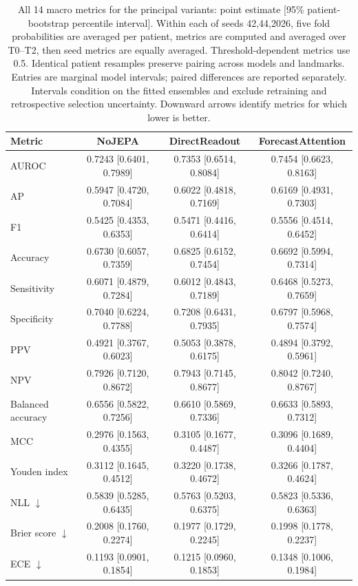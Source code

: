 \begin{table}[t]
\centering
\footnotesize
\setlength{\tabcolsep}{5pt}
\caption{All 14 macro metrics for the principal variants: point estimate [95\% patient-bootstrap percentile interval]. Within each of seeds 42,44,2026, five fold probabilities are averaged per patient, metrics are computed and averaged over T0--T2, then seed metrics are equally averaged. Threshold-dependent metrics use 0.5. Identical patient resamples preserve pairing across models and landmarks. Entries are marginal model intervals; paired differences are reported separately. Intervals condition on the fitted ensembles and exclude retraining and retrospective selection uncertainty. Downward arrows identify metrics for which lower is better.}
\label{tab:extended_macro}
\begin{tabular}{lccc}
\toprule
Metric & NoJEPA & DirectReadout & ForecastAttention \\
\midrule
AUROC & 0.7243 [0.6401, 0.7989] & 0.7353 [0.6514, 0.8084] & 0.7454 [0.6623, 0.8163] \\
AP & 0.5947 [0.4720, 0.7084] & 0.6022 [0.4818, 0.7169] & 0.6169 [0.4931, 0.7303] \\
F1 & 0.5425 [0.4353, 0.6353] & 0.5471 [0.4416, 0.6414] & 0.5556 [0.4514, 0.6452] \\
Accuracy & 0.6730 [0.6057, 0.7359] & 0.6825 [0.6152, 0.7454] & 0.6692 [0.5994, 0.7314] \\
Sensitivity & 0.6071 [0.4879, 0.7284] & 0.6012 [0.4843, 0.7189] & 0.6468 [0.5273, 0.7659] \\
Specificity & 0.7040 [0.6224, 0.7788] & 0.7208 [0.6431, 0.7935] & 0.6797 [0.5968, 0.7574] \\
PPV & 0.4921 [0.3767, 0.6023] & 0.5053 [0.3878, 0.6175] & 0.4894 [0.3792, 0.5961] \\
NPV & 0.7926 [0.7120, 0.8672] & 0.7943 [0.7145, 0.8677] & 0.8042 [0.7240, 0.8767] \\
Balanced accuracy & 0.6556 [0.5822, 0.7256] & 0.6610 [0.5869, 0.7336] & 0.6633 [0.5893, 0.7312] \\
MCC & 0.2976 [0.1563, 0.4355] & 0.3105 [0.1677, 0.4487] & 0.3096 [0.1689, 0.4404] \\
Youden index & 0.3112 [0.1645, 0.4512] & 0.3220 [0.1738, 0.4672] & 0.3266 [0.1787, 0.4624] \\
NLL $\downarrow$ & 0.5839 [0.5285, 0.6435] & 0.5763 [0.5203, 0.6375] & 0.5823 [0.5336, 0.6363] \\
Brier score $\downarrow$ & 0.2008 [0.1760, 0.2274] & 0.1977 [0.1729, 0.2245] & 0.1998 [0.1778, 0.2237] \\
ECE $\downarrow$ & 0.1193 [0.0901, 0.1854] & 0.1215 [0.0960, 0.1853] & 0.1348 [0.1006, 0.1984] \\
\bottomrule
\end{tabular}
\end{table}

